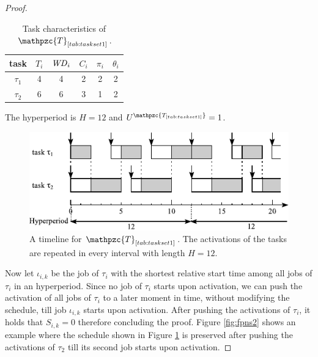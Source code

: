 \documentclass[conference,compsoc]{IEEEtran}
\newcommand{\wcd}   {\mbox{\it WD}}
\begin{document}
\begin{proof}

	\begin{table}[h]
		\center
		\caption{Task characteristics of $\mathpzc{T}_{\ref{tab:taskset1}}$.}
		\label{tab:taskset1}
		\begin{tabular}{c | c c c c c}
			\hline 
			task & $T_i$ & $\wcd_i$ & $C_i$ & $\pi_i$ & $\theta_i$  \\ 
			\hline 
			$\tau_1$& 4 & 4 & 2  & 2 & 2\\ 
			$\tau_2$& 6 & 6 & 3  & 1 & 2\\ 
			\hline 
		\end{tabular}
		\small
		\item The hyperperiod is $H=12$ and $U^{\mathpzc{T_{\ref{tab:taskset1}}}}=1$.
	\end{table}
	
	\begin{figure}[h]
		\centering
		\includegraphics[width=1\linewidth]{fig/fpns1}
		\caption{A timeline for $\mathpzc{T}_{\ref{tab:taskset1}}$. The activations of the tasks are repeated in every interval with length $H=12$.}
		\label{fig:fpns1}
	\end{figure}
	
	Now let $\iota_{i,k}$ be the job of $\tau_i$ with the shortest relative start time among all jobs of $\tau_i$ in an hyperperiod. Since no job of $\tau_i$ starts upon activation, we can push the activation of all jobs of $\tau_i$ to a later moment in time, without modifying the schedule, till job $\iota_{i,k}$ starts upon activation. After pushing the activations of $\tau_i$, it holds that $S_{i,k}=0$ therefore concluding the proof. Figure \ref{fig:fpns2} shows an example where the schedule shown in Figure \ref{fig:fpns1} is preserved after pushing the activations of $\tau_2$ till its second job starts upon activation.	
%	
\end{proof}
\end{document}
